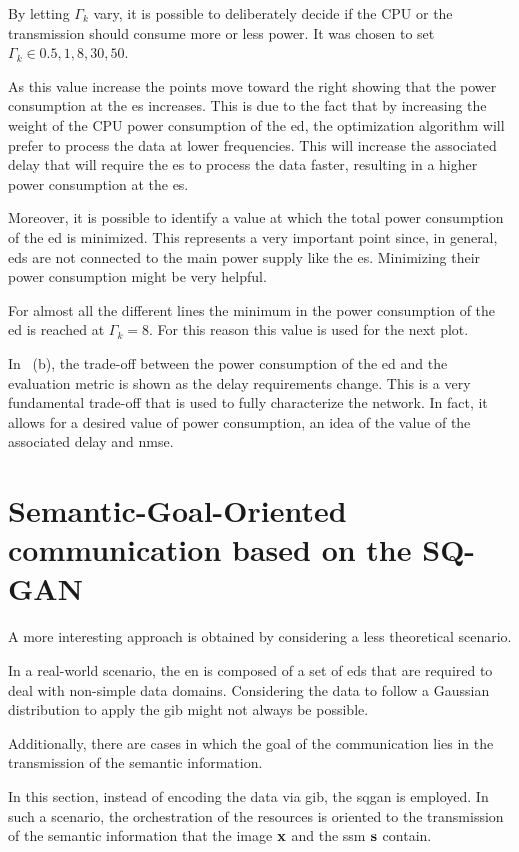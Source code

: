 By letting $\Gamma_k$ vary, it is possible to deliberately decide if the CPU or the transmission should consume more or less power. It was chosen to set $\Gamma_k \in {0.5, 1, 8, 30, 50}$.

As this value increase the points move toward the right showing that the power consumption at the \gls{es} increases. This is due to the fact that by increasing the weight of the CPU power consumption of the \gls{ed}, the optimization algorithm will prefer to process the data at lower frequencies. This will increase the associated delay that will require the \gls{es} to process the data faster, resulting in a higher power consumption at the \gls{es}.

Moreover, it is possible to identify a value at which the total power consumption of the \gls{ed} is minimized. This represents a very important point since, in general, \glspl{ed} are not connected to the main power supply like the \gls{es}. Minimizing their power consumption might be very helpful.

For almost all the different lines the minimum in the power consumption of the \gls{ed} is reached at $\Gamma_k=8$.  For this reason this value is used for the next plot.

In ~(b), the trade-off between the power consumption of the \gls{ed} and the evaluation metric is shown as the delay requirements change. This is a very fundamental trade-off that is used to fully characterize the network. In fact, it allows for a desired value of power consumption, an idea of the value of the associated delay and \gls{nmse}. 




\section{Semantic-Goal-Oriented communication based on the SQ-GAN}\label{sec: EN_nn}
A more interesting approach is obtained by considering a less theoretical scenario.

In a real-world scenario, the \gls{en} is composed of a set of \glspl{ed} that are required to deal with non-simple data domains. Considering the data to follow a Gaussian distribution to apply the \gls{gib} might not always be possible.

Additionally, there are cases in which the goal of the communication lies in the transmission of the semantic information.

In this section, instead of encoding the data via \gls{gib}, the \gls{sqgan} is employed. In such a scenario, the orchestration of the resources is oriented to the transmission of the semantic information that the image $\mathbf{x}$ and the \gls{ssm} $\mathbf{s}$ contain.

